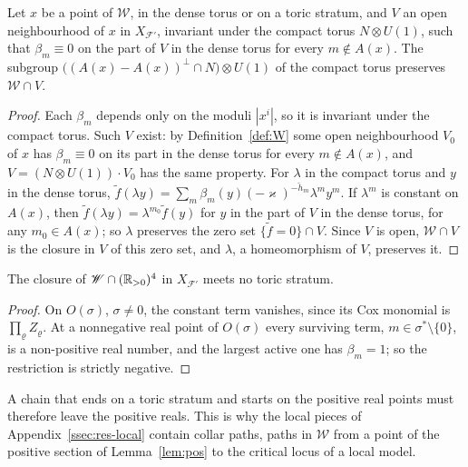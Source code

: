 \begin{lemma}\label{lem:symm}
Let $x$ be a point of $\mathscr W$, in the dense torus or on a toric stratum, and $V$ an open neighbourhood of $x$ in
$X_{\mathcal F'}$, invariant under the compact torus $N\otimes U(1)$, such that $\beta_m\equiv0$ on the part of $V$ in the
dense torus for every $m\notin A(x)$. The subgroup $\bigl((A(x)-A(x))^\perp\cap N\bigr)\otimes U(1)$ of the compact torus
preserves $\mathscr W\cap V$.
\end{lemma}
\begin{proof}
Each $\beta_m$ depends only on the moduli $|x^i|$, so it is invariant under the compact torus. Such $V$ exist: by
Definition~\ref{def:W} some open neighbourhood $V_0$ of $x$ has $\beta_m\equiv0$ on its part in the dense torus for every
$m\notin A(x)$, and $V=(N\otimes U(1))\cdot V_0$ has the same property. For $\lambda$ in the compact torus and $y$ in the
dense torus, $\tilde f(\lambda y)=\sum_m\beta_m(y)(-\varkappa)^{-\check h_m}\lambda^my^m$. If $\lambda^m$ is constant on $A(x)$, then
$\tilde f(\lambda y)=\lambda^{m_0}\tilde f(y)$ for $y$ in the part of $V$ in the dense torus, for any $m_0\in A(x)$; so
$\lambda$ preserves the zero set $\{\tilde f=0\}\cap V$. Since $V$ is open, $\mathscr W\cap V$ is the closure in $V$ of this zero set,
and $\lambda$, a homeomorphism of $V$, preserves it.
\end{proof}

\begin{lemma}\label{lem:stratum}
The closure of $\mathscr W\cap(\mathbb R_{>0})^4$ in $X_{\mathcal F'}$ meets no toric stratum.
\end{lemma}
\begin{proof}
On $O(\sigma)$, $\sigma\neq0$, the constant term vanishes, since its Cox monomial is $\prod_\varrho Z_\varrho$. At a
nonnegative real point of $O(\sigma)$ every surviving term, $m\in\sigma^*\setminus\{0\}$, is a non-positive real number, and
the largest active one has $\beta_m=1$; so the restriction is strictly negative.
\end{proof}

A chain that ends on a toric stratum and starts on the positive real points must therefore leave the positive reals. This is
why the local pieces of Appendix~\ref{ssec:res-local} contain collar paths, paths in $\mathscr W$ from a point of the positive section
of Lemma~\ref{lem:pos} to the critical locus of a local model.

